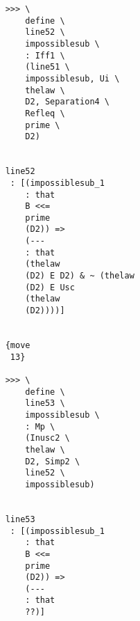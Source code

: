 \documentclass[12pt]{article}
\begin{document}
\begin{verbatim}
                                          >>> \
                                              define \
                                              line52 \
                                              impossiblesub \
                                              : Iff1 \
                                              (line51 \
                                              impossiblesub, Ui \
                                              thelaw \
                                              D2, Separation4 \
                                              Refleq \
                                              prime \
                                              D2)


                                          line52 
                                           : [(impossiblesub_1 
                                              : that 
                                              B <<= 
                                              prime 
                                              (D2)) => 
                                              (--- 
                                              : that 
                                              (thelaw 
                                              (D2) E D2) & ~ (thelaw 
                                              (D2) E Usc 
                                              (thelaw 
                                              (D2))))]


                                          {move 
                                           13}

                                          >>> \
                                              define \
                                              line53 \
                                              impossiblesub \
                                              : Mp \
                                              (Inusc2 \
                                              thelaw \
                                              D2, Simp2 \
                                              line52 \
                                              impossiblesub)


                                          line53 
                                           : [(impossiblesub_1 
                                              : that 
                                              B <<= 
                                              prime 
                                              (D2)) => 
                                              (--- 
                                              : that 
                                              ??)]



\end{verbatim}
\end{document}
